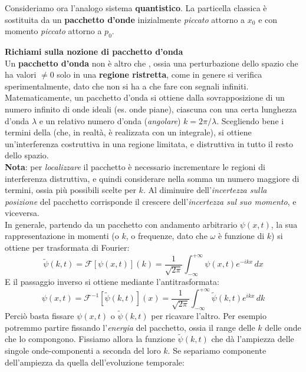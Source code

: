 \documentclass[../../FisicaTeorica.tex]{subfiles}
\begin{document}
\begin{center}

\end{center}
Consideriamo ora l'analogo sistema \textbf{quantistico}. 
La particella classica è sostituita da un \textbf{pacchetto d'onde} inizialmente \textit{piccato} attorno a $x_0$ e con momento \textit{piccato} attorno a $p_0$.\\
\begin{expl}
\textbf{Richiami sulla nozione di pacchetto d'onda}\\
Un \textbf{pacchetto d'onda} non è altro che , ossia una perturbazione dello spazio che ha valori $\neq 0$ solo in una \textbf{regione ristretta}, come in genere si verifica sperimentalmente, dato che non si ha a che fare con segnali infiniti.\\
Matematicamente, un pacchetto d'onda si ottiene dalla sovrapposizione di un numero infinito di onde ideali (es. onde piane), ciascuna con una certa lunghezza d'onda $\lambda$ e un relativo numero d'onda (\textit{angolare}) $k = 2\pi/\lambda$. Scegliendo bene i termini della  (che, in realtà, è realizzata con un integrale), si ottiene un'interferenza costruttiva in una regione limitata, e distruttiva in tutto il resto dello spazio.\\
\textbf{Nota}: per \textit{localizzare} il pacchetto è necessario incrementare le regioni di interferenza distruttiva, e quindi considerare nella somma un numero maggiore di termini, ossia più possibili scelte per $k$. Al diminuire dell'\textit{incertezza sulla posizione} del pacchetto corrisponde il crescere dell'\textit{incertezza sul suo momento}, e viceversa.\\
In generale, partendo da un pacchetto con andamento arbitrario $\psi(x,t)$, la sua rappresentazione in momenti (o $k$, o frequenze, dato che $\omega$ è funzione di $k$) si ottiene per trasformata di Fourier:
\[
\tilde{\psi}(k,t)=\mathcal{F}[\psi(x,t)](k)=\frac{1}{\sqrt{2\pi}}\int_{-\infty}^{+\infty}
\psi(x,t) e^{-ikx}\,dx
\]
E il passaggio inverso si ottiene mediante l'antitrasformata:
\[
\psi(x,t)=\mathcal{F}^{-1}[\tilde{\psi}(k,t)](x)=\frac{1}{\sqrt{2\pi}}\int_{-\infty}^{+\infty}\tilde{\psi}(k,t)e^{ikx}\,dk
\]
Perciò basta fissare $\psi(x,t)$ o $\tilde{\psi}(k,t)$ per ricavare l'altro. Per esempio potremmo partire fissando l'\textit{energia} del pacchetto, ossia il range delle $k$ delle onde che lo compongono. Fissiamo allora la funzione $\tilde{\psi}(k,t)$ che dà l'ampiezza delle singole onde-componenti a seconda del loro $k$. Se separiamo componente dell'ampiezza da quella dell'evoluzione temporale:

\end{expl}
\end{document}
